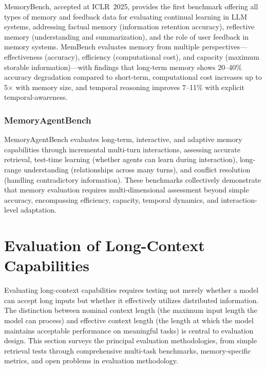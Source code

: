 \documentclass[11pt,letterpaper]{article}
\begin{document}
MemoryBench, accepted at ICLR~2025, provides the first benchmark offering all types of memory and feedback data for evaluating continual learning in LLM systems, addressing factual memory (information retention accuracy), reflective memory (understanding and summarization), and the role of user feedback in memory systems. MemBench evaluates memory from multiple perspectives---effectiveness (accuracy), efficiency (computational cost), and capacity (maximum storable information)---with findings that long-term memory shows 20--40\% accuracy degradation compared to short-term, computational cost increases up to 5$\times$ with memory size, and temporal reasoning improves 7--11\% with explicit temporal-awareness.

\subsubsection{MemoryAgentBench}

MemoryAgentBench evaluates long-term, interactive, and adaptive memory capabilities through incremental multi-turn interactions, assessing accurate retrieval, test-time learning (whether agents can learn during interaction), long-range understanding (relationships across many turns), and conflict resolution (handling contradictory information). These benchmarks collectively demonstrate that memory evaluation requires multi-dimensional assessment beyond simple accuracy, encompassing efficiency, capacity, temporal dynamics, and interaction-level adaptation.


\section{Evaluation of Long-Context Capabilities}
\label{sec:evaluation}

Evaluating long-context capabilities requires testing not merely whether a model can accept long inputs but whether it effectively utilizes distributed information. The distinction between nominal context length (the maximum input length the model can process) and effective context length (the length at which the model maintains acceptable performance on meaningful tasks) is central to evaluation design. This section surveys the principal evaluation methodologies, from simple retrieval tests through comprehensive multi-task benchmarks, memory-specific metrics, and open problems in evaluation methodology.
\end{document}
